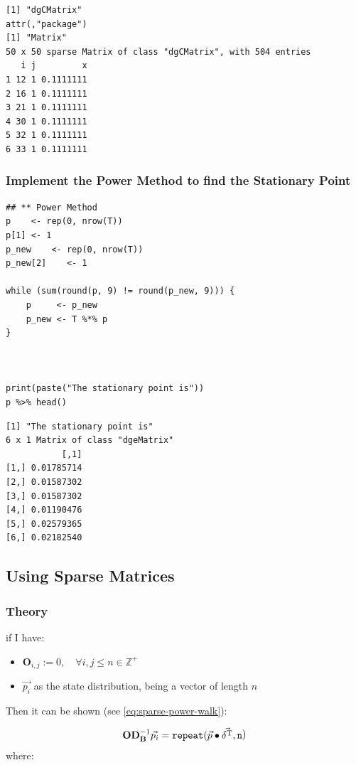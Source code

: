 \documentclass[11pt]{article}
\begin{document}
\begin{verbatim}
[1] "dgCMatrix"
attr(,"package")
[1] "Matrix"
50 x 50 sparse Matrix of class "dgCMatrix", with 504 entries
   i j         x
1 12 1 0.1111111
2 16 1 0.1111111
3 21 1 0.1111111
4 30 1 0.1111111
5 32 1 0.1111111
6 33 1 0.1111111
\end{verbatim}
\subsubsection{Implement the Power Method to find the Stationary Point}
\label{sec:org6e1153b}
\lstset{language=r,label= ,caption= ,captionpos=b,numbers=none}
\begin{lstlisting}
## ** Power Method
p    <- rep(0, nrow(T))
p[1] <- 1
p_new    <- rep(0, nrow(T))
p_new[2]    <- 1

while (sum(round(p, 9) != round(p_new, 9))) {
    p     <- p_new
    p_new <- T %*% p
}



print(paste("The stationary point is"))
p %>% head()
\end{lstlisting}

\begin{verbatim}
[1] "The stationary point is"
6 x 1 Matrix of class "dgeMatrix"
           [,1]
[1,] 0.01785714
[2,] 0.01587302
[3,] 0.01587302
[4,] 0.01190476
[5,] 0.02579365
[6,] 0.02182540
\end{verbatim}
\subsection{Using Sparse Matrices}
\label{sec:orgbc166e7}
\subsubsection{Theory}
\label{sec:org56c7320}
if I have:

\begin{itemize}
\item \(\mathbf{O}_{i, j} := 0, \quad \forall i,j\leq n \in \mathbb{Z}^+\)

\item \(\vec{p_i}\) as the state distribution, being a vector of length \(n\)
\end{itemize}

Then it can be shown (see \eqref{eq:sparse-power-walk}):

$$\begin{aligned}
    \mathbf{O} \mathbf{D}_{\mathbf{B}}^{-1} \vec{p_i} = \mathtt{repeat} (\vec{p} \bullet \vec{\delta^{\tiny \mathrm{T}}} \mathtt{, n}\end{aligned})$$
where:
\end{document}
